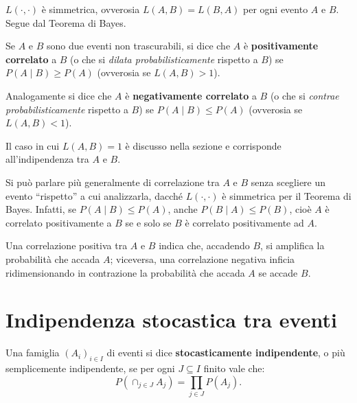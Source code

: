 \begin{multicols*}{2}
    \begin{proposition}
        $L(\cdot, \cdot)$ è simmetrica, ovverosia $L(A, B) = L(B, A)$ per
        ogni evento $A$ e $B$. Segue dal Teorema di Bayes.
    \end{proposition}

    \begin{definition}
        Se $A$ e $B$ sono due eventi non trascurabili, si dice
        che $A$ è \textbf{positivamente correlato} a $B$ (o che
        si \textit{dilata probabilisticamente} rispetto a $B$) se
        $P(A \mid B) \geq P(A)$ (ovverosia se $L(A, B) > 1$). \smallskip
        
        Analogamente
        si dice che $A$ è \textbf{negativamente correlato} a $B$
        (o che si \textit{contrae probabilisticamente} rispetto a $B$) se
        $P(A \mid B) \leq P(A)$ (ovverosia se $L(A, B) < 1$).
    \end{definition}

    \begin{remark}
        Il caso in cui $L(A, B) = 1$ è discusso nella sezione \textit{} e corrisponde all'indipendenza
        tra $A$ e $B$.
    \end{remark}

    \begin{remark}
        Si può parlare più generalmente di correlazione tra $A$ e $B$
        senza scegliere un evento ``rispetto'' a cui analizzarla, dacché
        $L(\cdot, \cdot)$ è simmetrica per il Teorema di Bayes. Infatti,
        se $P(A \mid B) \leq P(A)$, anche $P(B \mid A) \leq P(B)$, cioè
        $A$ è correlato positivamente a $B$ se e solo se $B$ è correlato
        positivamente ad $A$. \smallskip


        Una correlazione positiva tra $A$ e $B$ indica che, accadendo $B$,
        si amplifica la probabilità che accada $A$; viceversa, una correlazione
        negativa inficia ridimensionando in contrazione la probabilità che accada $A$
        se accade $B$.
    \end{remark}

    \section{Indipendenza stocastica tra eventi}
    \label{sec:indipendenza}

    \begin{definition}
        Una famiglia $(A_i)_{i \in I}$ di eventi si dice \textbf{stocasticamente
        indipendente}, o più semplicemente indipendente, se
        per ogni $J \subseteq I$ finito vale che:
        \[
            P(\cap_{j \in J} A_j) = \prod_{j \in J} P(A_j).
        \]


\end{definition}
\end{multicols*}
